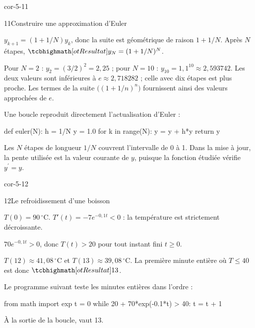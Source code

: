 \begin{blocLivre}{cor-5-11}
\begin{corrige}{11}{Construire une approximation d'Euler}
\begin{questions}
\item $y_{k+1}=(1+1/N)y_k$, donc la suite est géométrique de raison $1+1/N$.
Après $N$ étapes, $\res{y_N=(1+1/N)^N}$.
\item Pour $N=2$ : $y_2=(3/2)^2=2{,}25$ ; pour $N=10$ :
$y_{10}=1{,}1^{10}\approx2{,}593742$.
Les deux valeurs sont inférieures à $e\approx2{,}718282$ ; celle avec dix étapes est plus proche.
Les termes de la suite $\big((1+1/n)^n\big)$ fournissent ainsi des valeurs approchées de $e$.
\item Une boucle reproduit directement l'actualisation d'Euler :
\end{questions}
\begin{python}
def euler(N):
    h = 1/N
    y = 1.0
    for k in range(N):
        y = y + h*y
    return y
\end{python}

Les $N$ étapes de longueur $1/N$ couvrent l’intervalle de 0 à 1. Dans la mise à jour, la pente utilisée est la valeur courante de $y$, puisque la fonction étudiée vérifie $y^\prime=y$.

\label{figlivre-r05-11-euler-cor}

\end{corrige}
\end{blocLivre}
\begin{blocLivre}{cor-5-12}
\begin{corrige}{12}{Le refroidissement d'une boisson}
\begin{questions}
\item $T(0)=90\,{}^\circ$C.
$T'(t)=-7e^{-0{,}1t}<0$ : la température est strictement décroissante.
\item $70e^{-0{,}1t}>0$, donc $T(t)>20$ pour tout instant fini $t\geq0$.
\item $T(12)\approx41{,}08\,{}^\circ$C et $T(13)\approx39{,}08\,{}^\circ$C.
La première minute entière où $T\leq40$ est donc $\res{13}$.
\item Le programme suivant teste les minutes entières dans l'ordre :
\end{questions}
\begin{python}
from math import exp
t = 0
while 20 + 70*exp(-0.1*t) > 40:
    t = t + 1
\end{python}
À la sortie de la boucle,  vaut 13.
\end{corrige}
\end{blocLivre}
